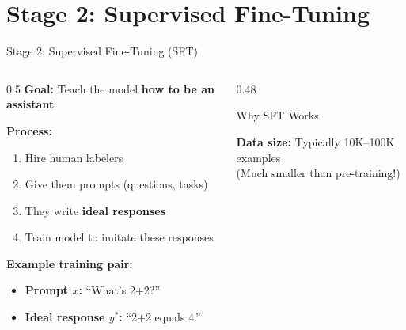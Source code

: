 \documentclass[aspectratio=169,11pt]{beamer}
\newcommand{\highlight}[1]{\textcolor{accentorange}{\textbf{#1}}}
\newcommand{\important}[1]{\textcolor{primaryblue}{\textbf{#1}}}
\begin{document}
\section{Stage 2: Supervised Fine-Tuning}

\begin{frame}{Stage 2: Supervised Fine-Tuning (SFT)}
\begin{columns}[T]
\begin{column}{0.5\textwidth}
\textbf{Goal:} Teach the model \highlight{how to be an assistant}

\vspace{0.3cm}
\textbf{Process:}
\begin{enumerate}
    \item Hire human labelers
    \item Give them prompts (questions, tasks)
    \item They write \important{ideal responses}
    \item Train model to imitate these responses
\end{enumerate}

\vspace{0.3cm}
\textbf{Example training pair:}
\begin{itemize}
    \item \textbf{Prompt $x$:} ``What's 2+2?''
    \item \textbf{Ideal response $y^*$:} ``2+2 equals 4.''
\end{itemize}
\end{column}
\begin{column}{0.48\textwidth}
\begin{block}{Why SFT Works}
\centering
{}
\end{block}

\vspace{0.2cm}
\textbf{Data size:} Typically 10K--100K examples\\
(Much smaller than pre-training!)
\end{column}
\end{columns}
\end{frame}
\end{document}
